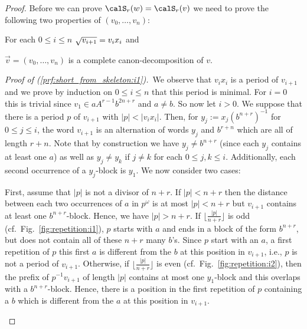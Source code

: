 \begin{proof}
	Before we can prove $\calS_r(w)=\calS_r(v)$ we need to prove the following two properties of $(v_0,\dots,v_n)$:
	\begin{alphaenumerate}
		\item For each $0\leq i\leq n$ $\sqrt{v_{i+1}}=v_ix_i$ and\label{prf:short_from_skeleton:i1}
		\item $\vec{v}=(v_0,\dots,v_{n})$ is a complete canon-decomposition of $v$.\label{prf:short_from_skeleton:i2}
	\end{alphaenumerate}
	\emph{Proof of (\ref{prf:short_from_skeleton:i1}).}\ We observe that $v_ix_i$ is a period of $v_{i+1}$ and we prove by induction on $0\leq i\leq n$ that this period is minimal. For $i=0$ this is trivial since $v_1\in aA^{r-1}b^{2n+r}$ and $a\neq b$. So now let $i>0$. We suppose that there is a period $p$ of $v_{i+1}$ with $|p|<|v_ix_i|$. Then, for $y_j:=x_j(b^{n+r})^{-1}$ for $0\leq j\leq i$, the word $v_{i+1}$ is an alternation of words $y_j$ and $b^{r+n}$ which are all of length $r+n$. Note that by construction we have $y_{j}\neq b^{n+r}$ (since each $y_{j}$ contains at least one $a$) as well as $y_{j}\neq y_{k}$ if $j\neq k$ for each $0\leq j,k\leq i$. Additionally, each second occurrence of a $y_j$-block is $y_1$. We now consider two cases:
	
	First, assume that $|p|$ is not a divisor of $n+r$. If $|p|<n+r$ then the distance between each two occurrences of $a$ in $p^\omega$ is at most $|p|<n+r$ but $v_{i+1}$ contains at least one $b^{n+r}$-block. Hence, we have $|p|>n+r$. If $\lfloor\frac{|p|}{n+r}\rfloor$ is odd (cf.\ Fig.~\ref{fig:repetition:i1}), $p$ starts with $a$ and ends in a block of the form $b^{n+r}$, but does not contain all of these $n+r$ many $b$'s. Since $p$ start with an $a$, a first repetition of $p$ this first $a$ is different from the $b$ at this position in $v_{i+1}$, i.e., $p$ is not a period of $v_{i+1}$. Otherwise, if $\lfloor\frac{|p|}{n+r}\rfloor$ is even (cf.\ Fig.~\ref{fig:repetition:i2}), then the prefix of $p^{-1}v_{i+1}$ of length $|p|$ contains at most one $y_1$-block and this overlaps with a $b^{n+r}$-block. Hence, there is a position in the first repetition of $p$ containing a $b$ which is different from the $a$ at this position in $v_{i+1}$.
	
	\begin{figure}[h]
		\begin{subfigure}{\textwidth}
			
		\end{subfigure}
		\begin{subfigure}{\textwidth}
			
		\end{subfigure}
		\caption{\label{fig:repetition}}
	\end{figure}
	

\end{proof}
